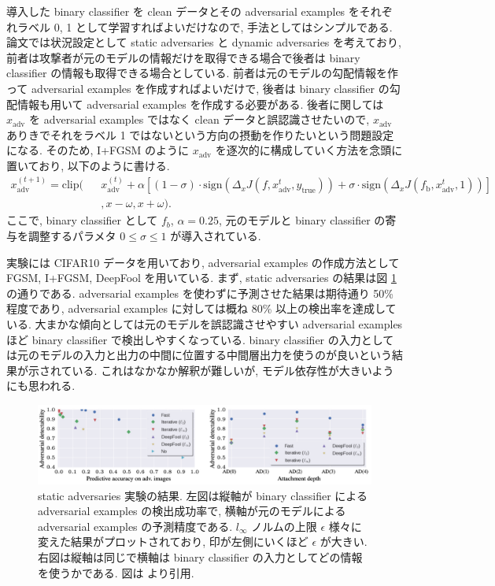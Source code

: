 導入した binary classifier を clean データとその adversarial examples をそれぞれラベル 0, 1 として学習すればよいだけなので, 手法としてはシンプルである.
論文では状況設定として static adversaries と dynamic adversaries を考えており, 前者は攻撃者が元のモデルの情報だけを取得できる場合で後者は binary classifier の情報も取得できる場合としている.
前者は元のモデルの勾配情報を作って adversarial examples を作成すればよいだけで, 後者は binary classifier の勾配情報も用いて adversarial examples を作成する必要がある.
後者に関しては $x_{\text{adv}}$ を adversarial examples ではなく clean データと誤認識させたいので, $x_{\text{adv}}$ ありきでそれをラベル 1 ではないという方向の摂動を作りたいという問題設定になる.
そのため, I+FGSM のように $x_{\text{adv}}$ を逐次的に構成していく方法を念頭に置いており, 以下のように書ける. 
%
\begin{eqnarray}
x_{\text{adv}}^{(t+1)} = \text{clip} ( &&x_{\text{adv}}^{(t)} + \alpha \left[ (1 - \sigma) \cdot \text{sign} \left( \Delta_x J(f, x_{\text{adv}}^{t}, y_{\text{true}}) \right) + \sigma \cdot \text{sign} \left( \Delta_x J(f_{\text{b}}, x_{\text{adv}}^{t}, 1) \right) \right] \nonumber \\
&&, x - \omega, x + \omega ).
\label{eq:on-detecting-adv}
\end{eqnarray}
%
ここで, binary classifier として $f_b$, $\alpha = 0.25$, 元のモデルと binary classifier の寄与を調整するパラメタ $0 \leq \sigma \leq 1$ が導入されている.

実験には CIFAR10 データを用いており, adversarial examples の作成方法として FGSM, I+FGSM, DeepFool を用いている.
まず, static adversaries の結果は図 \ref{fig:on-detecting-static} の通りである.
adversarial examples を使わずに予測させた結果は期待通り 50\% 程度であり, adversarial examples に対しては概ね 80\% 以上の検出率を達成している.
大まかな傾向としては元のモデルを誤認識させやすい adversarial examples ほど binary classifier で検出しやすくなっている.
binary classifier の入力としては元のモデルの入力と出力の中間に位置する中間層出力を使うのが良いという結果が示されている.
これはなかなか解釈が難しいが, モデル依存性が大きいようにも思われる.
%
\begin{figure}[htbp]
\begin{center}
\includegraphics[width=14.0cm]{figures/on-detecting-static.pdf}
\end{center}
\caption{
static adversaries 実験の結果.
左図は縦軸が binary classifier による adversarial examples の検出成功率で, 横軸が元のモデルによる adversarial examples の予測精度である.
$l_{\infty}$ ノルムの上限 $\epsilon$ 様々に変えた結果がプロットされており, 印が左側にいくほど $\epsilon$ が大きい.
右図は縦軸は同じで横軸は binary classifier の入力としてどの情報を使うかである.
図は \cite{metzen2017detecting} より引用.
}
\label{fig:on-detecting-static}
\end{figure}



